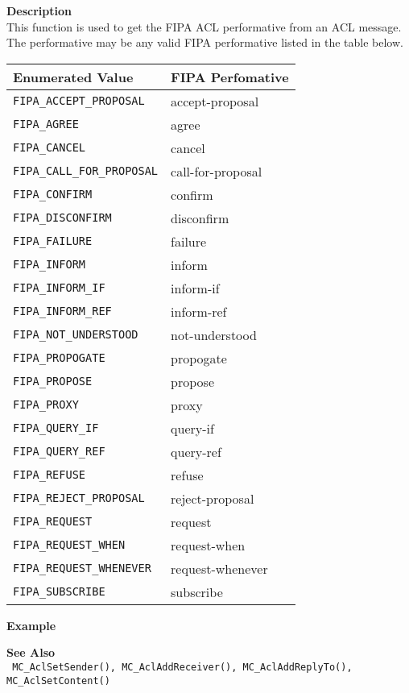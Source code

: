 \noindent
{\bf Description}\\
This function is used to get the FIPA ACL performative from an ACL message. 
The performative may be any valid FIPA performative listed in the table 
below. \\
\begin{tabular}{ll}
Enumerated Value & FIPA Perfomative \\ \hline
\texttt{FIPA\_ACCEPT\_PROPOSAL} & accept-proposal \\
\texttt{FIPA\_AGREE} & agree \\
\texttt{FIPA\_CANCEL} & cancel\\
\texttt{FIPA\_CALL\_FOR\_PROPOSAL} & call-for-proposal \\
\texttt{FIPA\_CONFIRM} & confirm\\
\texttt{FIPA\_DISCONFIRM} & disconfirm \\
\texttt{FIPA\_FAILURE} & failure \\
\texttt{FIPA\_INFORM} & inform \\
\texttt{FIPA\_INFORM\_IF} & inform-if \\
\texttt{FIPA\_INFORM\_REF} & inform-ref \\
\texttt{FIPA\_NOT\_UNDERSTOOD} & not-understood \\
\texttt{FIPA\_PROPOGATE} & propogate \\
\texttt{FIPA\_PROPOSE} & propose \\
\texttt{FIPA\_PROXY} & proxy \\
\texttt{FIPA\_QUERY\_IF} & query-if \\
\texttt{FIPA\_QUERY\_REF} & query-ref \\
\texttt{FIPA\_REFUSE} & refuse \\
\texttt{FIPA\_REJECT\_PROPOSAL} & reject-proposal \\
\texttt{FIPA\_REQUEST} & request \\
\texttt{FIPA\_REQUEST\_WHEN} & request-when \\
\texttt{FIPA\_REQUEST\_WHENEVER} & request-whenever \\
\texttt{FIPA\_SUBSCRIBE} & subscribe
\end{tabular}


\noindent
{\bf Example}\\
\noindent
{\footnotesize}

\noindent
{\bf See Also}\\
\texttt{
  MC\_AclSetSender(), MC\_AclAddReceiver(), MC\_AclAddReplyTo(), \linebreak 
    MC\_AclSetContent()
}

